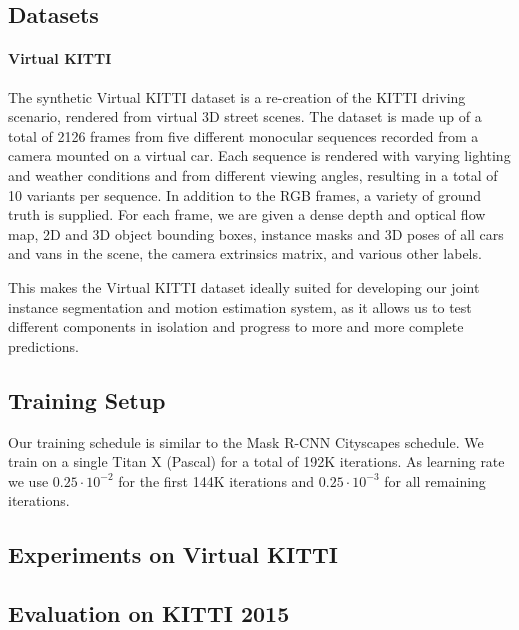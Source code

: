 
\subsection{Datasets}

\paragraph{Virtual KITTI}
The synthetic Virtual KITTI dataset is a re-creation of the KITTI driving scenario,
rendered from virtual 3D street scenes.
The dataset is made up of a total of 2126 frames from five different monocular sequences recorded from a camera mounted on
a virtual car.
Each sequence is rendered with varying lighting and weather conditions and from different viewing angles, resulting
in a total of 10 variants per sequence.
In addition to the RGB frames, a variety of ground truth is supplied.
For each frame, we are given a dense depth and optical flow map,
2D and 3D object bounding boxes, instance masks and 3D poses of all cars and vans in the scene,
the camera extrinsics matrix, and various other labels.

This makes the Virtual KITTI dataset ideally suited for developing our joint instance segmentation
and motion estimation system, as it allows us to test different components in isolation and
progress to more and more complete predictions.

\subsection{Training Setup}
Our training schedule is similar to the Mask R-CNN Cityscapes schedule.
We train on a single Titan X (Pascal) for a total of 192K iterations.
As learning rate we use $0.25 \cdot 10^{-2}$ for the first 144K iterations and $0.25 \cdot 10^{-3}$
for all remaining iterations.

\subsection{Experiments on Virtual KITTI}

\subsection{Evaluation on KITTI 2015}
